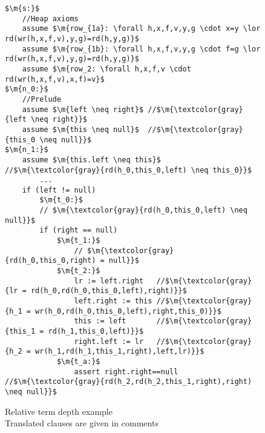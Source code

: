 \begin{figure}
\begin{lstlisting}[tabsize=1]
$\m{s:}$
	//Heap axioms
	assume $\m{row_{1a}: \forall h,x,f,v,y,g \cdot x=y \lor rd(wr(h,x,f,v),y,g)=rd(h,y,g)}$
	assume $\m{row_{1b}: \forall h,x,f,v,y,g \cdot f=g \lor rd(wr(h,x,f,v),y,g)=rd(h,y,g)}$
	assume $\m{row_2: \forall h,x,f,v \cdot rd(wr(h,x,f,v),x,f)=v}$
$\m{n_0:}$
	//Prelude
	assume $\m{left \neq right}$ //$\m{\textcolor{gray}{left \neq right}}$
	assume $\m{this \neq null}$  //$\m{\textcolor{gray}{this_0 \neq null}}$
$\m{n_1:}$
	assume $\m{this.left \neq this}$  //$\m{\textcolor{gray}{rd(h_0,this_0,left) \neq this_0}}$
		...
	if (left != null)
		$\m{t_0:}$
		// $\m{\textcolor{gray}{rd(h_0,this_0,left) \neq null}}$
		if (right == null)
			$\m{t_1:}$
				// $\m{\textcolor{gray}{rd(h_0,this_0,right) = null}}$
			$\m{t_2:}$
				lr := left.right   //$\m{\textcolor{gray}{lr = rd(h_0,rd(h_0,this_0,left),right)}}$
				left.right := this //$\m{\textcolor{gray}{h_1 = wr(h_0,rd(h_0,this_0,left),right,this_0)}}$
				this := left       //$\m{\textcolor{gray}{this_1 = rd(h_1,this_0,left)}}$
				right.left := lr   //$\m{\textcolor{gray}{h_2 = wr(h_1,rd(h_1,this_1,right),left,lr)}}$
			$\m{t_a:}$
				assert right.right==null //$\m{\textcolor{gray}{rd(h_2,rd(h_2,this_1,right),right) \neq null}}$
\end{lstlisting}
\caption{Relative term depth example\\
Translated clauses are given in comments}
\label{snippet4.2}
\end{figure}

